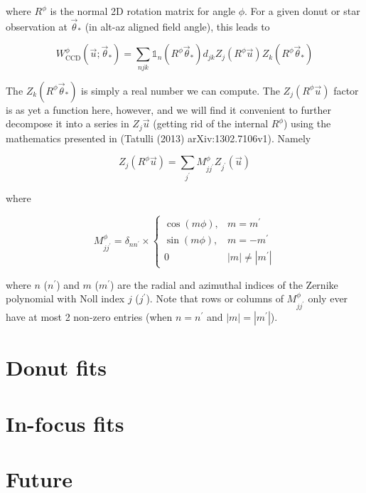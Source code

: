 \documentclass{article}
\begin{document}
where $R^\phi$ is the normal 2D rotation matrix for angle $\phi$.  For a given
donut or star observation at $\vec{\theta}_\ast$ (in alt-az aligned field
angle), this leads to

\begin{equation}
    W^\phi_\mathrm{CCD}\left(\vec{u}; \vec{\theta}_\ast\right) =
    \sum_{njk} \mathbb{1}_n(R^\phi \vec{\theta}_\ast) d_{jk} Z_j(R^\phi \vec{u}) Z_k(R^\phi \vec{\theta}_\ast)
\end{equation}

The $Z_k(R^\phi \vec{\theta}_\ast)$ is simply a real number we can compute.  The
$Z_j(R^\phi \vec{u})$ factor is as yet a function here, however, and we will
find it convenient to further decompose it into a series in $Z_j{\vec{u}}$
(getting rid of the internal $R^\phi$) using the mathematics presented in
(Tatulli (2013) arXiv:1302.7106v1).  Namely

\begin{equation}
    Z_j(R^\phi \vec{u}) = \sum_{j^\prime} M_{j j^\prime}^\phi Z_{j^\prime}(\vec{u})
\end{equation}

where

\begin{equation}
    M_{j j^\prime}^\phi = \delta_{n n^\prime} \times \begin{cases}
    \cos(m \phi), & m = m^\prime \\
    \sin(m \phi), & m = -m^\prime \\
    0 & |m| \ne |m^\prime|
\end{cases}
\end{equation}

where $n$ ($n^\prime$) and $m$ ($m^\prime$) are the radial and azimuthal indices
of the Zernike polynomial with Noll index $j$ ($j^\prime$).  Note that rows or
columns of $M^\phi_{j j^\prime}$ only ever have at most 2 non-zero entries (when
$n = n^\prime$ and $|m| = |m^\prime|$).

\section{Donut fits}
\section{In-focus fits}
\section{Future}
\end{document}
